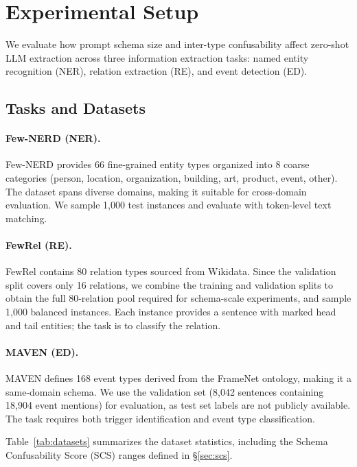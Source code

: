 \section{Experimental Setup}
\label{sec:experimental_setup}

We evaluate how prompt schema size and inter-type confusability affect zero-shot LLM extraction across three information extraction tasks: named entity recognition (NER), relation extraction (RE), and event detection (ED).

\subsection{Tasks and Datasets}
\label{sec:datasets}

\paragraph{Few-NERD (NER).}
Few-NERD \cite{fewnerd-2021} provides 66 fine-grained entity types organized into 8 coarse categories (person, location, organization, building, art, product, event, other). The dataset spans diverse domains, making it suitable for cross-domain evaluation. We sample 1{,}000 test instances and evaluate with token-level text matching.

\paragraph{FewRel (RE).}
FewRel \cite{fewrel-2018} contains 80 relation types sourced from Wikidata. Since the validation split covers only 16 relations, we combine the training and validation splits to obtain the full 80-relation pool required for schema-scale experiments, and sample 1{,}000 balanced instances. Each instance provides a sentence with marked head and tail entities; the task is to classify the relation.

\paragraph{MAVEN (ED).}
MAVEN \cite{maven-2020} defines 168 event types derived from the FrameNet ontology, making it a same-domain schema. We use the validation set (8{,}042 sentences containing 18{,}904 event mentions) for evaluation, as test set labels are not publicly available. The task requires both trigger identification and event type classification.

Table~\ref{tab:datasets} summarizes the dataset statistics, including the Schema Confusability Score (SCS) ranges defined in \S\ref{sec:scs}.

